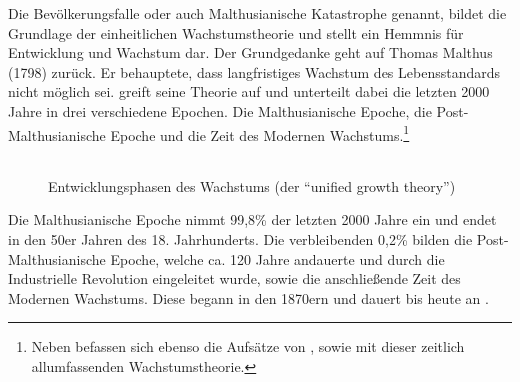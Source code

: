 %
Die Bevölkerungsfalle oder auch Malthusianische Katastrophe genannt, bildet die Grundlage der einheitlichen Wachstumstheorie und stellt ein Hemmnis für Entwicklung und Wachstum dar. Der Grundgedanke geht auf Thomas Malthus (1798) zurück. Er behauptete, dass langfristiges Wachstum des Lebensstandards nicht möglich sei. \cite{Galor.2011} greift seine Theorie auf und unterteilt dabei die letzten 2000 Jahre in drei verschiedene Epochen. Die Malthusianische Epoche, die Post-Malthusianische Epoche und die Zeit des Modernen Wachstums.\footnote{Neben \cite{Galor.2006} befassen sich ebenso die Aufsätze von \cite{Hansen.2002}, sowie \cite{Ashraf.2008} mit dieser zeitlich allumfassenden Wachstumstheorie.}\\

		\begin{figure}[htbp]
			\centering 
			\begin{tabular}{@{}r@{}}  
			\end{tabular}
			\caption{Entwicklungsphasen des Wachstums (der "`unified growth theory"')}\label{Epochen}
		\end{figure}
%		
Die Malthusianische Epoche nimmt 99,8{\%} der letzten 2000 Jahre ein und endet in den 50er Jahren des 18. Jahrhunderts. Die verbleibenden 0,2{\%} bilden die Post-Malthusianische Epoche, welche ca. 120 Jahre andauerte und durch die Industrielle Revolution eingeleitet wurde, sowie die anschließende Zeit des Modernen Wachstums. Diese begann in den 1870ern und dauert bis heute an \cite{Galor.2014}.\\
%
